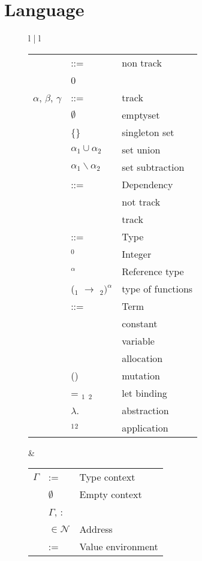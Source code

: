 \section{Language}
\begin{figure}[!htb]
\small
\centering
\begin{tabular}{l | l}
\begin{tabular}{r l l}
\nonterm{non-track} & ::= & non track \\
& 0 & \\
$\alpha$, $\beta$, $\gamma$ & ::= &  track \\
& $\emptyset$ &  emptyset \\
& \{\nonterm{x}\} & singleton set \\
& $\alpha_1 \cup \alpha_2$  & set union \\
& $\alpha_1 \backslash \alpha_2$ & set subtraction\\
\nonterm{d} & ::=  & Dependency \\
& \nonterm{non-track} 	& not track \\
& \nonterm{track} & track \\
\nonterm{T} & ::= & Type \\
& \nonterm{Int}$^{0}$ & Integer \\
& \nonterm{\&Int}$^{\alpha}$ & Reference type \\
& (\nonterm{T}$_1$ $\to$ \nonterm{T}$_2)^{\alpha}$ & type of functions \\
\nonterm{t} & ::= & Term \\
& \nonterm{c} & constant \\
& \nonterm{x} & variable \\
& \nonterm{alloc} & allocation \\
& \nonterm{inc}(\nonterm{x}) & mutation \\
& \KW{let} \nonterm{x} = \nonterm{t}$_1$ \KW{in} \nonterm{t}$_2$  & let binding \\
& $\lambda$\nonterm{x}.\nonterm{t} & abstraction \\
& \nonterm{t}$_1$\nonterm{t}$_2$ & application \\
\end{tabular} &
\begin{tabular}{r l l}
$\Gamma$ & :=  & Type context \\
& $\emptyset$ & Empty context \\
& $\Gamma$, \nonterm{x}:\nonterm{T} \\
\nonterm{l} & $\in \mathcal{N}$  & Address \\
\nonterm{H} & := & Value environment \\

\end{tabular}
\end{tabular}
\end{figure}
